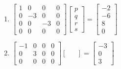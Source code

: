 \begin{exercise}
\begin{enumerate}
\item \(\begin{bmatrix} 1&0&0&0
\\0&-3&0&0
\\0&0&-3&0
\\0&0&0&0 \end{bmatrix}
\begin{bmatrix}p\\q\\r\\s\end{bmatrix}
=\begin{bmatrix} -2
\\-6
\\8
\\0 \end{bmatrix}\)

\item \(\begin{bmatrix} -1&0&0&0
\\0&3&0&0
\\0&0&0&0 \end{bmatrix}
\begin{bmatrix}&\end{bmatrix}
=\begin{bmatrix} -3
\\0
\\3 \end{bmatrix}\)

\end{enumerate}
\end{exercise}





